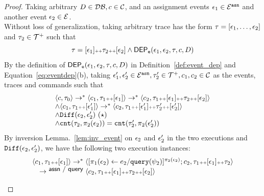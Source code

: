 \begin{proof}
Taking arbitrary $D \in \mathcal{DB} , c \in \mathcal{C}$, and an assignment events $\mathtt{\epsilon}_1 \in \mathcal{E}^{\mathtt{{asn}}}$ and another event 
$\mathtt{\epsilon}_2\in \mathcal{E}$.
\\
Without loss of generalization, 
taking arbitrary trace has the form $\mathtt{\tau} = [\mathtt{\epsilon}_1, \ldots, \mathtt{\epsilon}_2]$ 
 and $\mathtt{\tau}_2 \in \mathcal{T}^{+}$ such that
 \[
	\mathtt{\tau} = [\mathtt{\epsilon}_1] {\scriptscriptstyle ++} \mathtt{\tau}_2 {\scriptscriptstyle ++} [\mathtt{\epsilon}_2]
	\land
	\mathsf{DEP_{\mathtt{e}}}(\mathtt{\epsilon}_1, \mathtt{\epsilon}_2, \mathtt{\tau}, c, D)
	\]
%
By the definition of $\mathsf{DEP_{\mathtt{e}}}(\mathtt{\epsilon}_1, \mathtt{\epsilon}_2, \mathtt{\tau}, c, D)$ in Definition~\ref{def:event_dep}
and Equation~\ref{eq:eventdep}(b), 
taking $ \mathtt{\epsilon}_1', \mathtt{\epsilon}_2' \in \mathcal{E}^{\mathtt{{asn}}},
\mathtt{\tau}_2' \in \mathcal{T}^{+}, c_1, c_2 \in \mathcal{C}$ as the events, traces and commands
such that
%
\[
\begin{array}{l}
\config{c, \trace_0} \rightarrow^{*}
\config{c_1, \trace_1 \tracecat [\event_1]} \rightarrow^{*} \config{c_2, \trace_1 \tracecat [\event_1] \tracecat \trace_2 \tracecat [\event_2]} 
\\ \land
\config{c_1, \trace_1 \tracecat [\event_1']} \rightarrow^{*} \config{c_2, \trace_1 \tracecat [\event_1'] \tracecat \trace_2' \tracecat [\event_2']} 
\\
\land \diff(\event_2,\event_2' ) ~(\star) 
\\
\land 
    \vcounter(\trace_2, \pi_2(\event_2))
    = 
    \vcounter(\trace_2', \pi_2(\event_2'))
\end{array}
\]
%
%
By inversion Lemma.~\ref{lem:inv_event} on $\mathtt{\epsilon}_2$ and $\mathtt{\epsilon}_2'$ in the two executions
and $\mathtt{Diff}(\mathtt{\epsilon}_2, \mathtt{\epsilon}_2')$,
 we have the following two execution instances:
\[
	\begin{array}{l}
		\langle c_1, \mathtt{\tau}_1 {\scriptscriptstyle ++} [\mathtt{\epsilon}_1] \rangle \rightarrow^{*} \langle [\mathrel{ \pi_1(\mathtt{\epsilon}_2) \leftarrow e_2 / {\tt query}(\psi_2) }]{}^{\pi_2(\mathtt{\epsilon}_2)};c_2, \mathtt{\tau}_1 {\scriptscriptstyle ++} [\mathtt{\epsilon}_1] {\scriptscriptstyle ++} \mathtt{\tau}_2 \rangle 
		\\ \quad
		\rightarrow^{\textsf{\small{ assn / query}}} \langle c_2, \mathtt{\tau}_1 {\scriptscriptstyle ++} [\mathtt{\epsilon}_1] {\scriptscriptstyle ++} \mathtt{\tau}_2 {\scriptscriptstyle ++} [\mathtt{\epsilon}_2] \rangle  
	\end{array}
	\]
%
\[
	\begin{array}{l}

\end{array}\]
\end{proof}
